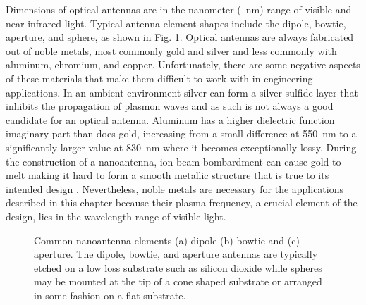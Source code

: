 \documentclass[11pt]{article}
\begin{document}
Dimensions of optical antennas are in the nanometer (\SI{}{\nano\metre}) range of visible and near infrared light. Typical antenna element shapes include the dipole, bowtie, aperture, and sphere, as shown in Fig. \ref{fig:antennas}. Optical antennas are always fabricated out of noble metals, most commonly gold and silver and less commonly with aluminum, chromium, and copper. Unfortunately, there are some negative aspects of these materials that make them difficult to work with in engineering applications. In an ambient environment silver can form a silver sulfide layer that inhibits the propagation of plasmon waves \cite{Nevels2014} and as such is not always a good candidate for an optical antenna. Aluminum has a higher dielectric function imaginary part than does gold, increasing from a small
difference at \SI{550}{\nano\metre} to a significantly larger value at \SI{830}{\nano\metre} where it becomes exceptionally lossy. During the construction of a nanoantenna, ion beam bombardment can cause gold to melt making it hard to form a smooth metallic structure that is true to its intended design \cite{farahani}. Nevertheless, noble metals are necessary for the applications described in this chapter because their plasma frequency, a crucial element of the design, lies in the wavelength range of visible light.
%
\begin{figure}[h!]
   \hfil
   \hfil
  \caption{Common nanoantenna elements (a) dipole (b) bowtie and (c) aperture. The dipole, bowtie, and aperture antennas are typically etched on a low loss substrate such as silicon dioxide while spheres may be mounted at the tip of a cone shaped substrate or arranged in some fashion on a flat substrate.}
  \label{fig:antennas}
\end{figure}
\end{document}
